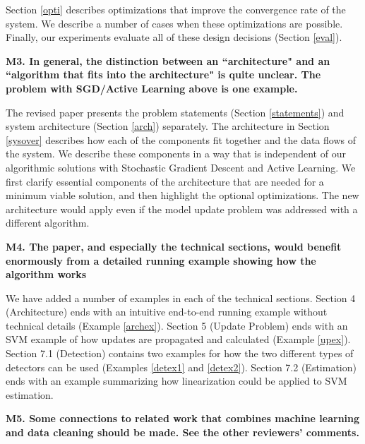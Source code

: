 Section \ref{opti} describes optimizations that improve the convergence rate of the system.
We describe a number of cases when these optimizations are possible.
Finally, our experiments evaluate all of these design decisions (Section \ref{eval}).

\vspace{0.5em}

\noindent\textbf{M3. In general, the distinction between an ``architecture" and an ``algorithm that fits into the architecture" is quite unclear. The problem with SGD/Active Learning above is one example.}

The revised paper presents the problem statements (Section \ref{statements}) and system architecture (Section \ref{arch}) separately.
The architecture in Section \ref{sysover} describes how each of the components fit together and the data flows of the system.
We describe these components in a way that is independent of our algorithmic solutions with Stochastic Gradient Descent and Active Learning.
We first clarify essential components of the architecture that are needed for a minimum viable solution, and then highlight the optional optimizations.
The new architecture would apply even if the model update problem was addressed with a different algorithm.

\vspace{0.5em}

\noindent\textbf{M4. The paper, and especially the technical sections, would benefit enormously from a detailed running example showing how the algorithm works}

We have added a number of examples in each of the technical sections. Section 4 (Architecture) ends with an intuitive end-to-end running example without technical details (Example \ref{archex}).
Section 5 (Update Problem) ends with an SVM example of how updates are propagated and calculated (Example \ref{upex}).
Section 7.1 (Detection) contains two examples for how the two different types of detectors can be used (Examples \ref{detex1} and \ref{detex2}).
Section 7.2 (Estimation) ends with an example summarizing how linearization could be applied to SVM estimation.

\vspace{0.5em}

\noindent\textbf{M5. Some connections to related work that combines machine learning and data cleaning should be made. See the other reviewers' comments.}

